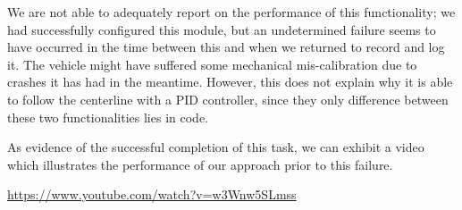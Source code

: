 We are not able to adequately report on the performance of this functionality;
we had successfully configured this module, but an undetermined failure
seems to have occurred in the time between this and when we returned to
record and log it. The vehicle might have suffered some mechanical
mis-calibration due to crashes it has had in the meantime. However,
this does not explain why it is able to follow the centerline with a
PID controller, since they only difference between these two functionalities
lies in code.

As evidence of the successful completion of this task, we can exhibit a
video which illustrates the performance of our approach prior to this failure.

\begin{center}
  \url{https://www.youtube.com/watch?v=w3Wnw5SLmss}
\end{center}
